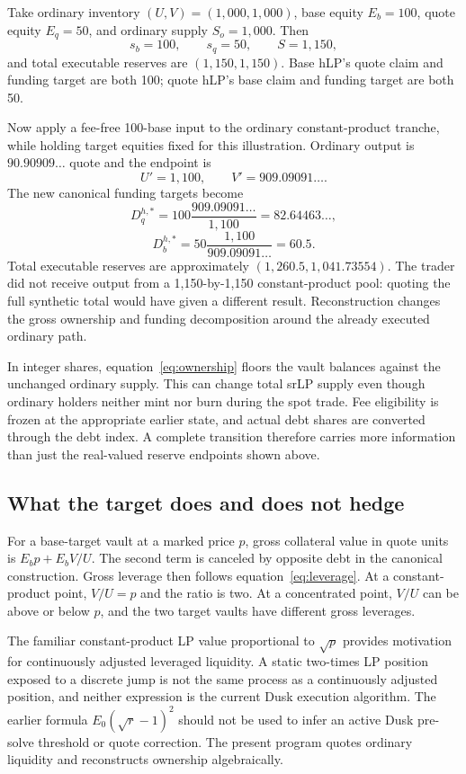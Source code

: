 Take ordinary inventory $(U,V)=(1{,}000,1{,}000)$, base equity $E_b=100$, quote equity $E_q=50$, and ordinary supply $S_o=1{,}000$. Then
\[
s_b=100,\qquad s_q=50,\qquad S=1{,}150,
\]
and total executable reserves are $(1{,}150,1{,}150)$. Base hLP's quote claim and funding target are both 100; quote hLP's base claim and funding target are both 50.

Now apply a fee-free 100-base input to the ordinary constant-product tranche, while holding target equities fixed for this illustration. Ordinary output is $90.90909\ldots$ quote and the endpoint is
\[
U'=1{,}100,\qquad V'=909.09091\ldots.
\]
The new canonical funding targets become
\[
D_q^{h,*}=100\frac{909.09091\ldots}{1{,}100}=82.64463\ldots,
\]
\[
D_b^{h,*}=50\frac{1{,}100}{909.09091\ldots}=60.5.
\]
Total executable reserves are approximately $(1{,}260.5,1{,}041.73554)$. The trader did not receive output from a 1,150-by-1,150 constant-product pool: quoting the full synthetic total would have given a different result. Reconstruction changes the gross ownership and funding decomposition around the already executed ordinary path.

In integer shares, equation~\eqref{eq:ownership} floors the vault balances against the unchanged ordinary supply. This can change total srLP supply even though ordinary holders neither mint nor burn during the spot trade. Fee eligibility is frozen at the appropriate earlier state, and actual debt shares are converted through the debt index. A complete transition therefore carries more information than just the real-valued reserve endpoints shown above.

\subsection{What the target does and does not hedge}

For a base-target vault at a marked price $p$, gross collateral value in quote units is $E_bp+E_bV/U$. The second term is canceled by opposite debt in the canonical construction. Gross leverage then follows equation~\eqref{eq:leverage}. At a constant-product point, $V/U=p$ and the ratio is two. At a concentrated point, $V/U$ can be above or below $p$, and the two target vaults have different gross leverages.

The familiar constant-product LP value proportional to $\sqrt p$ provides motivation for continuously adjusted leveraged liquidity. A static two-times LP position exposed to a discrete jump is not the same process as a continuously adjusted position, and neither expression is the current Dusk execution algorithm. The earlier formula $E_0(\sqrt r-1)^2$ should not be used to infer an active Dusk pre-solve threshold or quote correction. The present program quotes ordinary liquidity and reconstructs ownership algebraically.

